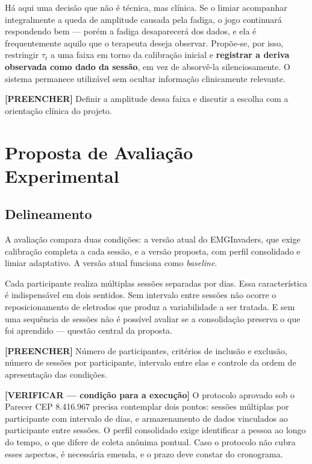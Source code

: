 Há aqui uma decisão que não é técnica, mas clínica. Se o limiar
acompanhar integralmente a queda de amplitude causada pela fadiga, o
jogo continuará respondendo bem --- porém a fadiga desaparecerá dos
dados, e ela é frequentemente aquilo que o terapeuta deseja observar.
Propõe-se, por isso, restringir $\tau_t$ a uma faixa em torno da
calibração inicial e \textbf{registrar a deriva observada como dado da
sessão}, em vez de absorvê-la silenciosamente. O sistema permanece
utilizável sem ocultar informação clinicamente relevante.

\textbf{[PREENCHER]} Definir a amplitude dessa faixa e discutir a
escolha com a orientação clínica do projeto.

\section{Proposta de Avaliação Experimental}

\subsection{Delineamento}

A avaliação compara duas condições: a versão atual do EMGInvaders, que
exige calibração completa a cada sessão, e a versão proposta, com
perfil consolidado e limiar adaptativo. A versão atual funciona como
\textit{baseline}.

Cada participante realiza múltiplas sessões separadas por dias. Essa
característica é indispensável em dois sentidos. Sem intervalo entre
sessões não ocorre o reposicionamento de eletrodos que produz a
variabilidade a ser tratada. E sem uma sequência de sessões não é
possível avaliar se a consolidação preserva o que foi aprendido ---
questão central da proposta.

\textbf{[PREENCHER]} Número de participantes, critérios de inclusão e
exclusão, número de sessões por participante, intervalo entre elas e
controle da ordem de apresentação das condições.

\vspace{0.5em}
\noindent\textbf{[VERIFICAR --- condição para a execução]} O protocolo
aprovado sob o Parecer CEP 8.416.967 precisa contemplar dois pontos:
sessões múltiplas por participante com intervalo de dias, e
armazenamento de dados vinculados ao participante entre sessões. O
perfil consolidado exige identificar a pessoa ao longo do tempo, o que
difere de coleta anônima pontual. Caso o protocolo não cubra esses
aspectos, é necessária emenda, e o prazo deve constar do cronograma.


